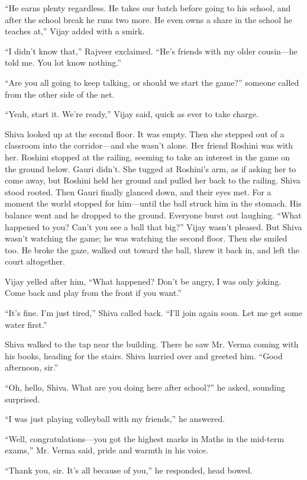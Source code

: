 ``He earns plenty regardless. He takes our batch before going to his school, and after the school break he runs two more. He even owns a share in the school he teaches at,'' Vijay added with a smirk.

``I didn't know that,'' Rajveer exclaimed. ``He's friends with my older cousin—he told me. You lot know nothing.''

``Are you all going to keep talking, or should we start the game?'' someone called from the other side of the net.

``Yeah, start it. We're ready,'' Vijay said, quick as ever to take charge.

Shiva looked up at the second floor. It was empty. Then she stepped out of a classroom into the corridor—and she wasn't alone. Her friend Roshini was with her. Roshini stopped at the railing, seeming to take an interest in the game on the ground below. Gauri didn't. She tugged at Roshini's arm, as if asking her to come away, but Roshini held her ground and pulled her back to the railing. Shiva stood rooted. Then Gauri finally glanced down, and their eyes met. For a moment the world stopped for him—until the ball struck him in the stomach. His balance went and he dropped to the ground. Everyone burst out laughing. ``What happened to you? Can't you see a ball that big?'' Vijay wasn't pleased. But Shiva wasn't watching the game; he was watching the second floor. Then she smiled too. He broke the gaze, walked out toward the ball, threw it back in, and left the court altogether.

Vijay yelled after him, ``What happened? Don't be angry, I was only joking. Come back and play from the front if you want.''

``It's fine. I'm just tired,'' Shiva called back. ``I'll join again soon. Let me get some water first.''

Shiva walked to the tap near the building. There he saw Mr. Verma coming with his books, heading for the stairs. Shiva hurried over and greeted him. ``Good afternoon, sir.''

``Oh, hello, Shiva. What are you doing here after school?'' he asked, sounding surprised.

``I was just playing volleyball with my friends,'' he answered.

``Well, congratulations—you got the highest marks in Maths in the mid-term exams,'' Mr. Verma said, pride and warmth in his voice.

``Thank you, sir. It's all because of you,'' he responded, head bowed.

